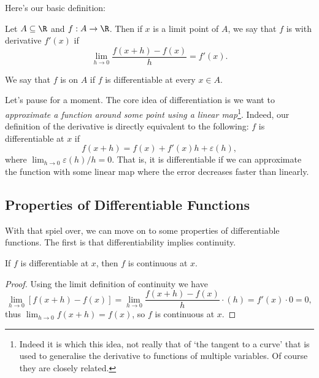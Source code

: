 Here's our basic definition:

\begin{definition}[Differentiability]
	Let $A \subseteq \R$ and $f: A \rightarrow \R$. 
	Then if $x$ is a limit point of $A$, we say that $f$ is  with derivative $f'(x)$ if
	$$
	\lim_{h \to 0} \frac{f(x + h) - f(x)}{h} = f'(x).
	$$

	We say that $f$ is  on $A$ if $f$ is differentiable at every $x \in A$.
\end{definition}

Let's pause for a moment. The core idea of differentiation is 
we want to \emph{approximate a function around some point using a linear map}\footnote{Indeed it is which this idea, not really that of `the tangent to a curve' that is used to generalise the derivative to functions of multiple variables. Of course they are closely related.}. Indeed, our definition of the derivative is directly equivalent to the following: $f$ is differentiable at $x$ if
$$
	f(x + h) = f(x) + f'(x)h + \varepsilon(h),
$$
where $\lim_{h\to 0} \varepsilon(h)/h = 0$. That is, it is differentiable if we can approximate the function with some linear map where the error decreases faster than linearly.



\subsection{Properties of Differentiable Functions}

With that spiel over, we can move on to some properties of differentiable functions. The first is that differentiability implies continuity.

\begin{proposition}
	If $f$ is differentiable at $x$, then $f$ is continuous at $x$.
\end{proposition}
\begin{proof}
	Using the limit definition of continuity we have
	$$\lim_{h \to 0} \left[f(x + h) - f(x)\right] = \lim_{h \to 0} \frac{f(x + h) - f(x)}{h} \cdot (h) = f'(x) \cdot 0 = 0,
	$$
	thus $\lim_{h \to 0} f(x + h) = f(x)$, so $f$ is continuous at $x$.
\end{proof}

